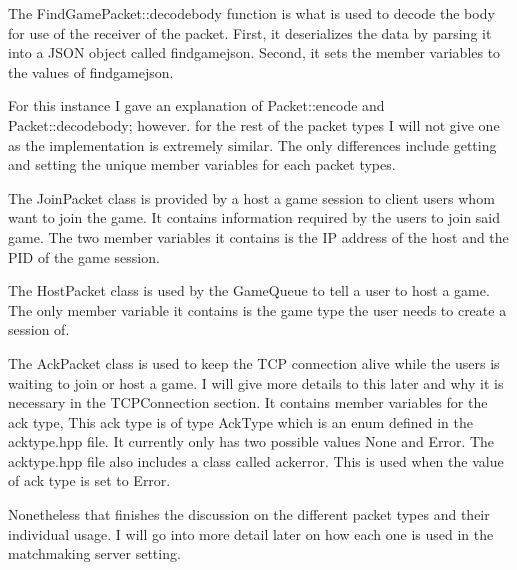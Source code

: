 \documentclass[conference]{IEEEtran}
\begin{document}
The  FindGamePacket::decode\textunderscore body function is what is used to decode the body for use of the receiver of the packet.
First, it deserializes the data by parsing it into a JSON object called find\textunderscore game\textunderscore json.
Second, it sets the member variables to the values of find\textunderscore game\textunderscore json.

For this instance I gave an explanation of Packet::encode and Packet::decode\textunderscore body; however. for the rest of the packet types I will not give one as the implementation is extremely similar.
The only differences include getting and setting the unique member variables for each packet types.


The JoinPacket class is provided by a host a game session to client users whom want to join the game. 
It contains information required by the users to join said game.
The two member variables it contains is the IP address of the host and the PID of the game session.

The HostPacket class is used by the GameQueue to tell a user to host a game.
The only member variable it contains is the game type the user needs to create a session of.

The AckPacket class is used to keep the TCP connection alive while the users is waiting to join or host a game.
I will give more details to this later and why it is necessary in the TCPConnection section.
It contains member variables for the ack type,
This ack type is of type AckType which is an enum defined in the ack\textunderscore type.hpp file.
It currently only has two possible values None and Error.
The ack\textunderscore type.hpp file also includes a class called ack\textunderscore error.
This is used when the value of ack type is set to Error.

Nonetheless that finishes the discussion on the different packet types and their individual usage.
I will go into more detail later on how each one is used in the matchmaking server setting.
\end{document}
